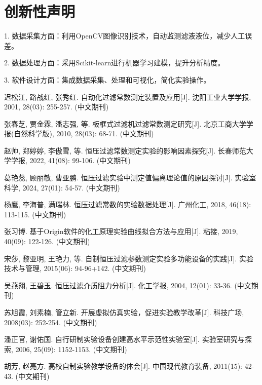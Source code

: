 \documentclass[UTF8,a4paper,fontset=none]{ctexart}
\newcommand{\liuhao}{\fontsize{7.5pt}{9pt}\selectfont}        %
\begin{document}
\section{创新性声明}

1. 数据采集方面：利用OpenCV图像识别技术，自动监测滤液液位，减少人工误差。

2. 数据处理方面：采用Scikit-learn进行机器学习建模，提升分析精度。

3. 软件设计方面：集成数据采集、处理和可视化，简化实验操作。


\pagebreak{}

{\liuhao

\begin{thebibliography}{99}   %

     迟松江, 路战红, 张秀红. 自动化过滤常数测定装置及应用[J]. 沈阳工业大学学报, 2001, 28(03): 255-257.	(中文期刊)

     张春芝, 贾金霖, 潘志强, 等. 板框式过滤机过滤常数测定研究[J]. 北京工商大学学报(自然科学版), 2010, 28(03): 68-71.	(中文期刊)

     赵帅, 郑婷婷, 李傲雪, 等. 恒压过滤常数测定实验的影响因素探究[J]. 长春师范大学学报, 2022, 41(08): 99-106.	(中文期刊)

     葛艳蕊, 顾丽敏, 曹亚鹏. 恒压过滤实验中测定值偏离理论值的原因探讨[J]. 实验室科学, 2024, 27(01): 54-57.	(中文期刊)

     杨鹰, 李海普, 满瑞林. 恒压过滤常数的实验数据处理[J]. 广州化工, 2018, 46(18): 113-115.	(中文期刊)

     张习博. 基于Origin软件的化工原理实验曲线拟合方法与应用[J]. 粘接, 2019, 40(09): 122-126.	(中文期刊)

     宋莎, 黎亚明, 王艳力, 等. 自制恒压过滤参数测定实验多功能设备的实践[J]. 实验技术与管理, 2015(06): 94-96+142.	(中文期刊)

     吴燕翔, 王碧玉. 恒压过滤介质阻力分析[J]. 化工学报, 2004, 12(01): 33-36.	(中文期刊)

     苏旭霞, 刘素楠, 管立新. 开展虚拟仿真实验，促进实验教学改革[J]. 科技广场, 2008(03): 252-254.	(中文期刊)

     潘正官, 谢佑国. 自行研制实验设备创建高水平示范性实验室[J]. 实验室研究与探索, 2006, 25(09): 1152-1153.	(中文期刊)

     胡芳, 赵亮方. 高校自制实验教学设备的体会[J]. 中国现代教育装备, 2011(15): 42-43.	(中文期刊)


\end{thebibliography}}
\end{document}
